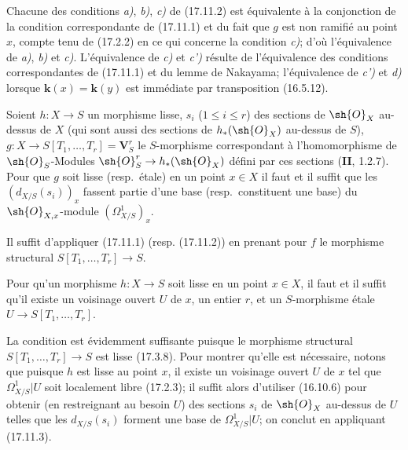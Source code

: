 Chacune des conditions \emph{a)}, \emph{b)}, \emph{c)} de (17.11.2) est équivalente à la conjonction de la condition correspondante de (17.11.1) et du fait que $g$ est non ramifié au point $x$, compte tenu de (17.2.2) en ce qui concerne la condition \emph{c)}; d'où l'équivalence de \emph{a)}, \emph{b)} et \emph{c)}. L'équivalence de \emph{c)} et \emph{c')} résulte de l'équivalence des conditions correspondantes de (17.11.1) et du lemme de Nakayama; l'équivalence de \emph{c')} et \emph{d)} lorsque $\boldsymbol{k}(x)=\boldsymbol{k}(y)$ est immédiate par transposition (16.5.12).

\begin{corollary}[17.11.3]
\label{IV.17.11.3}
Soient $h:X\to S$ un morphisme lisse, $s_i$ \textup{($1\leq i\leq r$)} des sections de $\sh{O}_X$ au-dessus de $X$ \textup{(}qui sont aussi des sections de $h_*(\sh{O}_X)$ au-dessus de $S$\textup{)}, $g:X\to S[T_1,\ldots,T_r]=\mathbf{V}_S^r$ le $S$-morphisme correspondant à l'homomorphisme de $\sh{O}_S$-Modules $\sh{O}_S^r\to h_*(\sh{O}_X)$ défini par ces sections \textup{(\textbf{II}, 1.2.7)}. Pour que $g$ soit lisse \textup{(resp.}\ étale\textup{)} en un point $x\in X$ il faut et il suffit que les $(d_{X/S}(s_i))_x$ fassent partie d'une base \textup{(resp.}\ constituent une base\textup{)} du $\sh{O}_{X,x}$-module $(\varOmega^1_{X/S})_x$.
\end{corollary}

Il suffit d'appliquer (17.11.1) (resp. (17.11.2)) en prenant pour $f$ le morphisme structural $S[T_1,\ldots,T_r]\to S$.

\begin{corollary}[17.11.4]
\label{IV.17.11.4}
Pour qu'un morphisme $h:X\to S$ soit lisse en un point $x\in X$, il faut et il suffit qu'il existe un voisinage ouvert $U$ de $x$, un entier $r$, et un $S$-morphisme étale $U\to S[T_1,\ldots,T_r]$.
\end{corollary}


La condition est évidemment suffisante puisque le morphisme structural $S[T_1,\ldots,T_r]\to S$ est lisse (17.3.8). Pour montrer qu'elle est nécessaire, notons que puisque $h$ est lisse au point $x$, il existe un voisinage ouvert $U$ de $x$ tel que $\varOmega^1_{X/S}|U$ soit localement libre (17.2.3); il suffit alors d'utiliser (16.10.6) pour obtenir (en restreignant au besoin $U$) des sections $s_i$ de $\sh{O}_X$ au-dessus de $U$ telles que les $d_{X/S}(s_i)$ forment une base de $\varOmega^1_{X/S}|U$; on conclut en appliquant (17.11.3).

